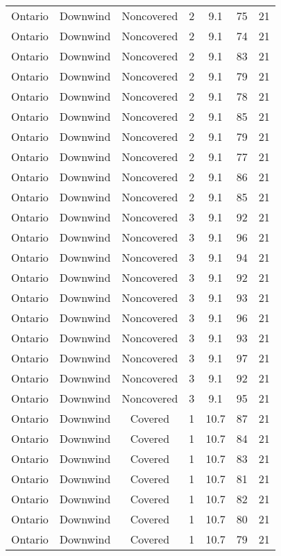 \documentclass{article}
\begin{document}
\begin{longtable}[H]{ccccccc}
Ontario & Downwind & Noncovered & 2 & 9.1  & 75  & 21 \\
Ontario & Downwind & Noncovered & 2 & 9.1  & 74  & 21 \\
Ontario & Downwind & Noncovered & 2 & 9.1  & 83  & 21 \\
Ontario & Downwind & Noncovered & 2 & 9.1  & 79  & 21 \\
Ontario & Downwind & Noncovered & 2 & 9.1  & 78  & 21 \\
Ontario & Downwind & Noncovered & 2 & 9.1  & 85  & 21 \\
Ontario & Downwind & Noncovered & 2 & 9.1  & 79  & 21 \\
Ontario & Downwind & Noncovered & 2 & 9.1  & 77  & 21 \\
Ontario & Downwind & Noncovered & 2 & 9.1  & 86  & 21 \\
Ontario & Downwind & Noncovered & 2 & 9.1  & 85  & 21 \\
Ontario & Downwind & Noncovered & 3 & 9.1  & 92  & 21 \\
Ontario & Downwind & Noncovered & 3 & 9.1  & 96  & 21 \\
Ontario & Downwind & Noncovered & 3 & 9.1  & 94  & 21 \\
Ontario & Downwind & Noncovered & 3 & 9.1  & 92  & 21 \\
Ontario & Downwind & Noncovered & 3 & 9.1  & 93  & 21 \\
Ontario & Downwind & Noncovered & 3 & 9.1  & 96  & 21 \\
Ontario & Downwind & Noncovered & 3 & 9.1  & 93  & 21 \\
Ontario & Downwind & Noncovered & 3 & 9.1  & 97  & 21 \\
Ontario & Downwind & Noncovered & 3 & 9.1  & 92  & 21 \\
Ontario & Downwind & Noncovered & 3 & 9.1  & 95  & 21 \\
Ontario & Downwind & Covered     & 1 & 10.7 & 87  & 21 \\
Ontario & Downwind & Covered     & 1 & 10.7 & 84  & 21 \\
Ontario & Downwind & Covered     & 1 & 10.7 & 83  & 21 \\
Ontario & Downwind & Covered     & 1 & 10.7 & 81  & 21 \\
Ontario & Downwind & Covered     & 1 & 10.7 & 82  & 21 \\
Ontario & Downwind & Covered     & 1 & 10.7 & 80  & 21 \\
Ontario & Downwind & Covered     & 1 & 10.7 & 79  & 21 \\

\end{longtable}
\end{document}
